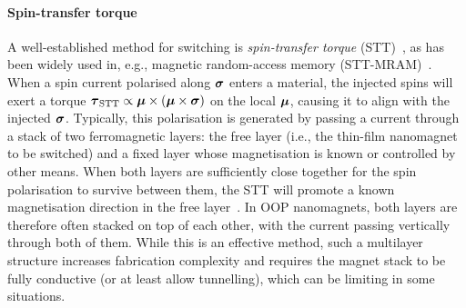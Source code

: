 \paragraph{Spin-transfer torque}
A well-established method for switching  is \emph{spin-transfer torque} (STT)~\cite{SlonczewskiSTT}, as has been widely used in, e.g., magnetic random-access memory (STT-MRAM)~\cite{brataas2012current}.
When a spin current polarised along $\boldsymbol{\mathbf{\sigma}}$ enters a  material, the injected spins will exert a torque $\boldsymbol{\mathbf{\tau}}_\mathrm{STT} \propto \boldsymbol{\mathbf{\mu}} \times (\boldsymbol{\mathbf{\mu}} \times \boldsymbol{\mathbf{\sigma}})$ on the local  $\boldsymbol{\mathbf{\mu}}$, causing it to align with the injected  $\boldsymbol{\mathbf{\sigma}}$.
Typically, this polarisation is generated by passing a current through a stack of two ferromagnetic layers: the free layer (i.e., the thin-film nanomagnet to be switched) and a fixed layer whose magnetisation is known or controlled by other means.
When both layers are sufficiently close together for the spin polarisation to survive between them, the STT will promote a known magnetisation direction in the free layer~\cite{SOT_FM_AFM,mumax3tutorial}. %
In OOP nanomagnets, both layers are therefore often stacked on top of each other, with the current passing vertically through both of them.
While this is an effective method, such a multilayer structure increases fabrication complexity and requires the magnet stack to be fully conductive (or at least allow tunnelling), which can be limiting in some situations.


